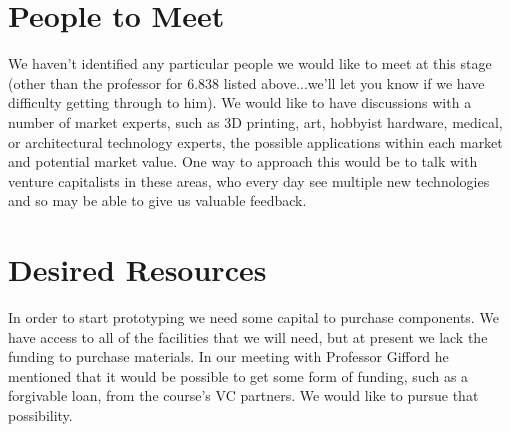 \documentclass[10pt]{article}
\begin{document}
\section{People to Meet} We haven't identified any particular people we would
like to meet at this stage (other than the professor for 6.838 listed
above...we'll let you know if we have difficulty getting through to him). We
would like to have discussions with a number of market experts, such as 3D
printing, art, hobbyist hardware, medical, or architectural technology experts,
the possible applications within each market and potential market value. One way
to approach this would be to talk with venture capitalists in these areas, who every
day see multiple new technologies and so may be able to give us
valuable feedback.

\section{Desired Resources} In order to start prototyping we need some capital
to purchase components. We have access to all of the facilities that we will
need, but at present we lack the funding to purchase materials. In our meeting
with Professor Gifford he mentioned that it would be possible to get some form
of funding, such as a forgivable loan, from the course's VC partners. We would
like to pursue that possibility.
\end{document}

